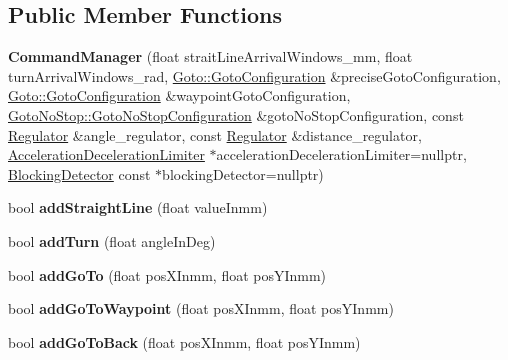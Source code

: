 \subsection*{Public Member Functions}
\begin{DoxyCompactItemize}
\item 
\mbox{\label{classCommandManager_af6da9c7fc32ee660e3a7d4d7ac295861}} 
{\bfseries Command\+Manager} (float strait\+Line\+Arrival\+Windows\+\_\+mm, float turn\+Arrival\+Windows\+\_\+rad, \hyperlink{structGoto_1_1GotoConfiguration}{Goto\+::\+Goto\+Configuration} \&precise\+Goto\+Configuration, \hyperlink{structGoto_1_1GotoConfiguration}{Goto\+::\+Goto\+Configuration} \&waypoint\+Goto\+Configuration, \hyperlink{structGotoNoStop_1_1GotoNoStopConfiguration}{Goto\+No\+Stop\+::\+Goto\+No\+Stop\+Configuration} \&goto\+No\+Stop\+Configuration, const \hyperlink{classRegulator}{Regulator} \&angle\+\_\+regulator, const \hyperlink{classRegulator}{Regulator} \&distance\+\_\+regulator, \hyperlink{classAccelerationDecelerationLimiter}{Acceleration\+Deceleration\+Limiter} $\ast$acceleration\+Deceleration\+Limiter=nullptr, \hyperlink{classBlockingDetector}{Blocking\+Detector} const $\ast$blocking\+Detector=nullptr)
\item 
\mbox{\label{classCommandManager_a9b51b6d329b129cfa43b227f4bdaccd9}} 
bool {\bfseries add\+Straight\+Line} (float value\+Inmm)
\item 
\mbox{\label{classCommandManager_a4ae87591d4c1dddced671fe4c34ba052}} 
bool {\bfseries add\+Turn} (float angle\+In\+Deg)
\item 
\mbox{\label{classCommandManager_ac93949131b022f2ba6c9b4396dcaf7df}} 
bool {\bfseries add\+Go\+To} (float pos\+X\+Inmm, float pos\+Y\+Inmm)
\item 
\mbox{\label{classCommandManager_a8b99a15252007750b7f63b352e281deb}} 
bool {\bfseries add\+Go\+To\+Waypoint} (float pos\+X\+Inmm, float pos\+Y\+Inmm)
\item 
\mbox{\label{classCommandManager_a944dc9036ce270b8e1a1034eb5d26259}} 
bool {\bfseries add\+Go\+To\+Back} (float pos\+X\+Inmm, float pos\+Y\+Inmm)
\item 
\mbox{\label{classCommandManager_ac65209ae5141e0fb2082ed3f55f083a1}} 

\end{DoxyCompactItemize}
